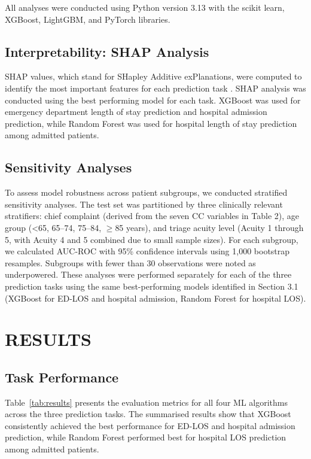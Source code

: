 \documentclass[harvard,article]{frontiersinFPHY_FAMS}
\begin{document}
All analyses were conducted using Python version 3.13 with the scikit learn, XGBoost, LightGBM, and PyTorch libraries.

\subsection{Interpretability: SHAP Analysis}

SHAP values, which stand for SHapley Additive exPlanations, were computed to identify the most important features for each prediction task \cite{feretzakis2024, slack2022}. SHAP analysis was conducted using the best performing model for each task. XGBoost was used for emergency department length of stay prediction and hospital admission prediction, while Random Forest was used for hospital length of stay prediction among admitted patients.

\subsection{Sensitivity Analyses}
To assess model robustness across patient subgroups, we conducted stratified sensitivity analyses. The test set was partitioned by three clinically relevant stratifiers: chief complaint (derived from the seven CC variables in Table 2), age group (<65, 65--74, 75--84, $\geq$85 years), and triage acuity level (Acuity 1 through 5, with Acuity 4 and 5 combined due to small sample sizes). For each subgroup, we calculated AUC-ROC with 95\% confidence intervals using 1,000 bootstrap resamples. Subgroups with fewer than 30 observations were noted as underpowered. These analyses were performed separately for each of the three prediction tasks using the same best-performing models identified in Section 3.1 (XGBoost for ED-LOS and hospital admission, Random Forest for hospital LOS).

\section{RESULTS}

\subsection{Task Performance}

Table~\ref{tab:results} presents the evaluation metrics for all four ML algorithms across the three prediction tasks. The summarised results show that XGBoost consistently achieved the best performance for ED-LOS and hospital admission prediction, while Random Forest performed best for hospital LOS prediction among admitted patients.
\end{document}
